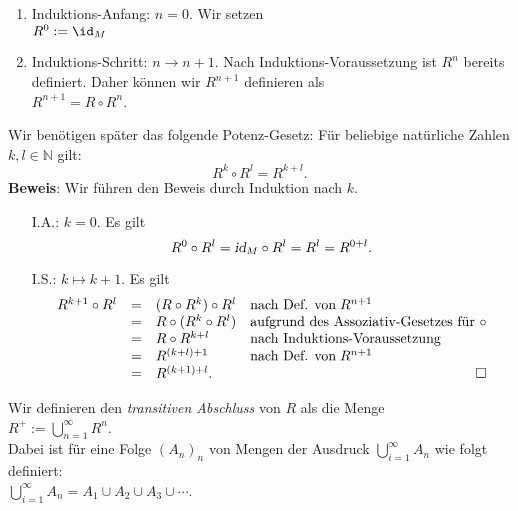 \begin{enumerate}
\item Induktions-Anfang: $n= 0$.  Wir setzen \\[0.2cm]
      \hspace*{1.3cm} $R^0 := \id_M$
\item Induktions-Schritt: $n \rightarrow n + 1$. Nach Induktions-Voraussetzung ist $R^n$
      bereits definiert. Daher k\"{o}nnen wir $R^{n+1}$ definieren als \\[0.2cm]
      \hspace*{1.3cm} $R^{n+1} = R \circ R^n$.
\end{enumerate}
Wir ben\"{o}tigen sp\"{a}ter das folgende Potenz-Gesetz:  F\"{u}r beliebige 
nat\"{u}rliche Zahlen $k,l \in \mathbb{N}$ gilt:
\[ R^k \circ R^l = R^{k+l}. \]
\textbf{Beweis}:  Wir f\"{u}hren den Beweis durch Induktion nach $k$.
\begin{enumerate}
\item[I.A.:] $k = 0$.  Es gilt
             \[ R^0 \circ R^l = \textsl{id}_M \circ R^l = R^l = R^{0+l}. \]
\item[I.S.:] $k \mapsto k+1$.  Es gilt
             \[
             \begin{array}{lcll}
               R^{k+1} \circ R^l & = & (R \circ R^k) \circ R^l &
                                       \mbox{nach Def. von}\; R^{n+1} \\
                                 & = & R \circ (R^k \circ R^l) &
                                       \mbox{aufgrund des Assoziativ-Gesetzes f\"{u}r $\circ$}                                       \\
                                 & = & R \circ R^{k+l} &
                                       \mbox{nach Induktions-Voraussetzung} \\
                                 & = & R^{(k+l)+1} &
                                       \mbox{nach Def. von}\; R^{n+1} \\
                                 & = & R^{(k+1)+l}. & \hspace*{\fill} \Box
             \end{array}
             \]
\end{enumerate}
\vspace*{0.3cm}

\noindent
Wir definieren den \emph{transitiven Abschluss} von $R$ als die Menge \\[0.2cm]
\hspace*{1.3cm} $R^+ := \bigcup\limits_{n=1}^{\infty} R^n$. \\
Dabei ist f\"{u}r eine Folge $(A_n)_n$ von Mengen der Ausdruck $\bigcup\limits_{i=1}^{\infty} A_n$ 
wie folgt definiert: \\[-0.1cm]
\hspace*{1.3cm} $\bigcup\limits_{i=1}^{\infty} A_n = A_1 \cup A_2 \cup A_3 \cup \cdots $. \\[0.2cm]

